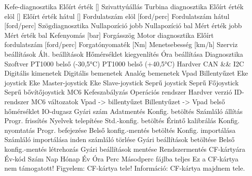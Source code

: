  {Kefe-diagnosztika}
 {Előírt érték [\percent ]}
 {Szivattyúállás}
 {Turbina diagnosztika}
 {Előírt érték elöl [\percent ]}
 {Előírt érték hátul [\percent ]}
 {Fordulatszám elöl [ford/perc]}
 {Fordulatszám hátul [ford/perc]}
 {Szögdiagnosztika}
 {Nullapozíció jobb}
 {Nullapozíció bal}
 {Mért érték jobb}
 {Mért érték bal}
 {Kefenyomás [bar]}
 {Forgásszög}
 {Motor diagnosztika}
 {Előírt fordulatszám [ford/perc]}
 {Forgatónyomaték [Nm]}
 {Menetsebesség [km/h]}
 {Szerviz beállítások}
 {Ált. beállítások}
 {Hőmérséklet kiegyenlítés}
 {Óra beállítása}
 {Diagnosztika}
 {Szoftver}
 {PT1000 belső (-30,5°C)}
 {PT1000 belső (+40,5°C)}
 {Hardver}
 {CAN && I2C}
 {Digitális kimenetek}
 {Digitális bemenetek}
 {Analóg bemenetek}
 {Vpad}
 {Billentyűzet}
 {Eke joystick}
 {Eke Master-joystick}
 {Eke Slave-joystick}
 {Seprű joystick}
 {Seprű Főjoystick}
 {Seprű bővítőjoystick}
 {MC6}
 {Kefeszabályzás}
 {Operációs rendszer}
 {Hardver verzió}
 {ID-rendszer}
 {MC6 változatok}
 {Vpad -> billentyűzet}
 {Billentyűzet -> Vpad}
 {belső hőmérséklet}
 {IO-dugasz}
 {Gyári szám}
 {Adatmentés}
 {Konfig. betöltés}
 {Számláló állítás}
 {Progr. frissítés}
 {Nyelvek telepítése}
 {Std.-konfig. betöltés}
 {Érintő kalibrálás}
 {Konfig. nyomtatás}
 {Progr. befejezése}
 {Belső konfig.-mentés betöltés}
 {Konfig. importálása}
 {Számláló importálása}
 {inden számláló törlése}
 {Gyári beállítások betöltése}
 {Belső konfig.-mentés létrehozás}
 {Gyári beállítások mentése}
 {Rendszermentés CF-kártyára}
 {Év-kód}
 {Szám}
 {Nap}
 {Hónap}
 {Év}
 {Óra}
 {Perc}
 {Másodperc}
 {fájlba}
 {teljes}
 {Ez a CF-kártya nem támogatott!}
 {Figyelem: CF-kártya tele!}
 {Információ: CF-kártya majdnem tele.}

